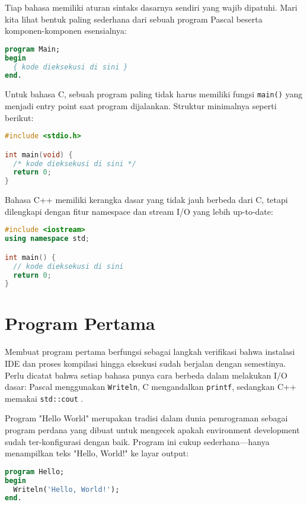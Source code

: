 \documentclass[../main.tex]{subfiles}
\begin{document}
Tiap bahasa memiliki aturan sintaks dasarnya sendiri yang wajib dipatuhi. Mari kita lihat bentuk paling sederhana dari sebuah program Pascal beserta komponen-komponen esensialnya:

\begin{lstlisting}[language=Pascal, caption={Kerangka program Pascal}]
program Main;
begin
  { kode dieksekusi di sini }
end.
\end{lstlisting}

Untuk bahasa C, sebuah program paling tidak harus memiliki fungsi \texttt{main()} yang menjadi entry point saat program dijalankan. Struktur minimalnya seperti berikut:

\begin{lstlisting}[language=C, caption={Kerangka program C}]
#include <stdio.h>

int main(void) {
  /* kode dieksekusi di sini */
  return 0;
}
\end{lstlisting}

Bahasa C++ memiliki kerangka dasar yang tidak jauh berbeda dari C, tetapi dilengkapi dengan fitur namespace dan stream I/O yang lebih up-to-date:

\begin{lstlisting}[language=C++, caption={Kerangka program C++}]
#include <iostream>
using namespace std;

int main() {
  // kode dieksekusi di sini
  return 0;
}
\end{lstlisting}

\section{Program Pertama}
Membuat program pertama berfungsi sebagai langkah verifikasi bahwa instalasi IDE dan proses kompilasi hingga eksekusi sudah berjalan dengan semestinya. Perlu dicatat bahwa setiap bahasa punya cara berbeda dalam melakukan I/O dasar: Pascal menggunakan \texttt{Writeln}, C mengandalkan \texttt{printf}, sedangkan C++ memakai \texttt{std::cout} \parencite{w3pascal-io,gnu-c-manual,cpp-reference}.

Program "Hello World" merupakan tradisi dalam dunia pemrograman sebagai program perdana yang dibuat untuk mengecek apakah environment development sudah ter-konfigurasi dengan baik. Program ini cukup sederhana—hanya menampilkan teks "Hello, World!" ke layar output:

\begin{lstlisting}[language=Pascal, caption={Hello World pada Pascal}]
program Hello;
begin
  Writeln('Hello, World!');
end.
\end{lstlisting}
\end{document}
